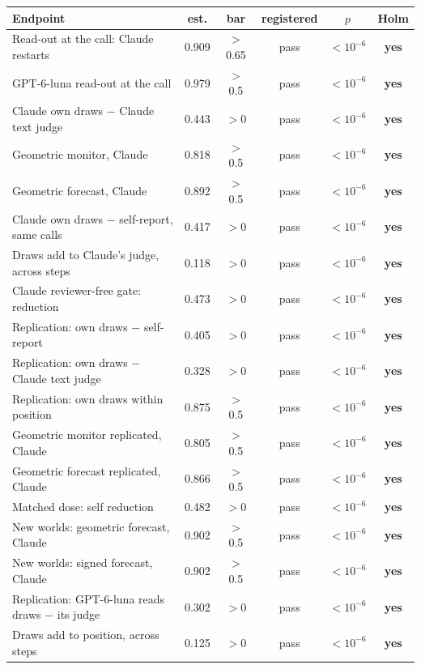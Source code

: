 \begin{center}\scriptsize
\setlength{\tabcolsep}{3pt}
\begin{tabular}{@{}lccccc@{}}
\toprule
\rowcolor{gbhead}\textbf{Endpoint} & \textbf{est.} & \textbf{bar} & \textbf{registered} & \textbf{$p$} & \textbf{Holm}\\
\midrule
Read-out at the call: Claude restarts & 0.909 & $>$0.65 & pass & $<10^{-6}$ & \textbf{yes}\\
GPT-6-luna read-out at the call & 0.979 & $>$0.5 & pass & $<10^{-6}$ & \textbf{yes}\\
Claude own draws $-$ Claude text judge & 0.443 & $>$0 & pass & $<10^{-6}$ & \textbf{yes}\\
Geometric monitor, Claude & 0.818 & $>$0.5 & pass & $<10^{-6}$ & \textbf{yes}\\
Geometric forecast, Claude & 0.892 & $>$0.5 & pass & $<10^{-6}$ & \textbf{yes}\\
Claude own draws $-$ self-report, same calls & 0.417 & $>$0 & pass & $<10^{-6}$ & \textbf{yes}\\
Draws add to Claude's judge, across steps & 0.118 & $>$0 & pass & $<10^{-6}$ & \textbf{yes}\\
Claude reviewer-free gate: reduction & 0.473 & $>$0 & pass & $<10^{-6}$ & \textbf{yes}\\
Replication: own draws $-$ self-report & 0.405 & $>$0 & pass & $<10^{-6}$ & \textbf{yes}\\
Replication: own draws $-$ Claude text judge & 0.328 & $>$0 & pass & $<10^{-6}$ & \textbf{yes}\\
Replication: own draws within position & 0.875 & $>$0.5 & pass & $<10^{-6}$ & \textbf{yes}\\
Geometric monitor replicated, Claude & 0.805 & $>$0.5 & pass & $<10^{-6}$ & \textbf{yes}\\
Geometric forecast replicated, Claude & 0.866 & $>$0.5 & pass & $<10^{-6}$ & \textbf{yes}\\
Matched dose: self reduction & 0.482 & $>$0 & pass & $<10^{-6}$ & \textbf{yes}\\
New worlds: geometric forecast, Claude & 0.902 & $>$0.5 & pass & $<10^{-6}$ & \textbf{yes}\\
New worlds: signed forecast, Claude & 0.902 & $>$0.5 & pass & $<10^{-6}$ & \textbf{yes}\\
Replication: GPT-6-luna reads draws $-$ its judge & 0.302 & $>$0 & pass & $<10^{-6}$ & \textbf{yes}\\
Draws add to position, across steps & 0.125 & $>$0 & pass & $<10^{-6}$ & \textbf{yes}\\

\end{tabular}
\end{center}
